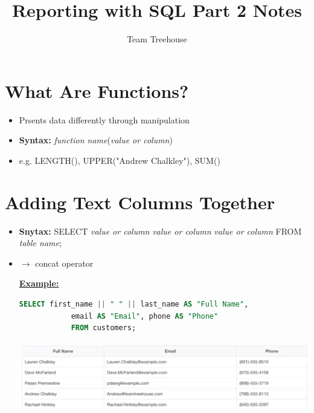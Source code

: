 \documentclass[12pt]{article}
\begin{document}
\title{Reporting with SQL Part 2 Notes}
\author{Team Treehouse}
\maketitle

\bigskip

\section{What Are Functions?}

\bigskip

\begin{itemize}
    \item Prsents data differently through manipulation
    \item \textbf{Syntax:} \textit{function name}(\textit{value or column})
    \item e.g. LENGTH(), UPPER("Andrew Chalkley"), SUM()
\end{itemize}

\bigskip

\section{Adding Text Columns Together}

\bigskip

\begin{itemize}
    \item \textbf{Snytax:} SELECT \textit{value or column} \textbar \textbar \textit{value or column} \textbar \textbar \textit{value or column}  FROM \textit{table name};
    \item \textbar \textbar $\to$ concat operator
    \bigskip

    \underline{\textbf{Example:}}

    \bigskip

    \begin{lstlisting}[language=SQL]
    SELECT first_name || " " || last_name AS "Full Name",
            email AS "Email", phone AS "Phone"
            FROM customers;
    \end{lstlisting}

    \bigskip

    \begin{center}
    \includegraphics[width=\linewidth]{images/part_2_notes_1.png}
    \end{center}

\end{itemize}
\end{document}
